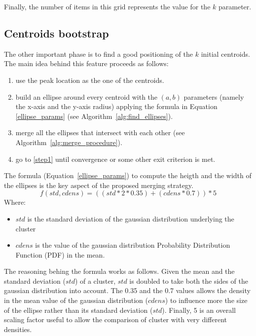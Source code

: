Finally, the number of items in this grid represents the value for the $k$ parameter.


\subsection*{Centroids bootstrap}
The other important phase is to find a good positioning of the $k$ initial centroids.
The main idea behind this feature proceeds as follows:
\begin{enumerate}
    \item \label{step1} use the peak location as the one of the centroids.
    \item build an ellipse around every centroid with the $(a,b)$ parameters (namely the x-axis
        and the y-axis radius) applying the formula in Equation \ref{ellipse_params} (see
        Algorithm~\ref{alg:find_ellipses}).
    \item merge all the ellipses that intersect with each other (see 
        Algorithm~\ref{alg:merge_procedure}).
    \item go to \ref{step1} until convergence or some other exit criterion is met.
\end{enumerate}




The formula (Equation~\ref{ellipse_params}) to compute the heigth and the width of the ellipses 
is the key aspect of the proposed merging strategy.
\begin{equation}
\label{ellipse_params}
    f(std, cdens) = ((std * 2 * 0.35) + (cdens * 0.7)) * 5
\end{equation}
Where:
\begin{itemize}
    \item $std$ is the standard deviation of the gaussian distribution underlying the cluster
    \item $cdens$ is the value of the gaussian distribution Probability Distribution Function (PDF)
        in the mean.
\end{itemize}

The reasoning behing the formula works as follows. Given the mean and the standard deviation ($std$)
of a cluster, $std$ is doubled to take both the sides of the gaussian distribution into account.
The 0.35 and the 0.7 values allows the density in the mean value of the gaussian distribution ($cdens$) 
to influence more the size of the ellipse rather than its standard deviation ($std$). Finally, 5 is
an overall scaling factor useful to allow the comparison of cluster with very different densities.

